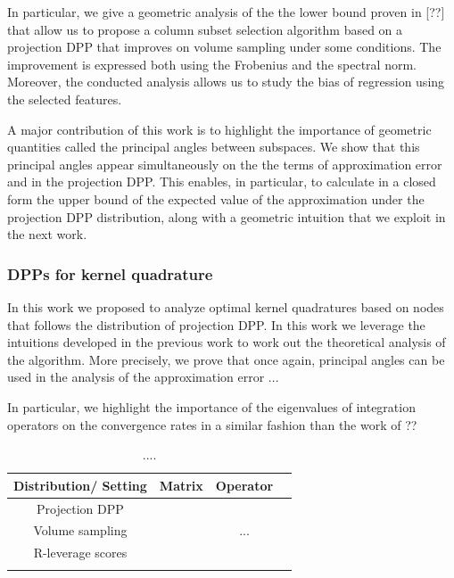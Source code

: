 \documentclass[twoside,11pt]{book}
\begin{document}
In particular, we give a geometric analysis of the the lower bound proven in [??] that allow us to propose a column subset selection algorithm based on a projection DPP that improves on volume sampling under some conditions. The improvement is expressed both using the Frobenius and the spectral norm. Moreover, the conducted analysis allows us to study the bias of regression using the selected features.

A major contribution of this work is to highlight the importance of geometric quantities called the principal angles between subspaces. We show that this principal angles appear simultaneously on the the terms of approximation error and in the projection DPP. This enables, in particular, to calculate in a closed form the upper bound of the expected value of the approximation under the projection DPP distribution, along with a geometric intuition that we exploit in the next work.

\subsubsection{DPPs for kernel quadrature}

In this work we proposed to analyze optimal kernel quadratures based on nodes that follows the distribution of projection DPP. 
In this work we leverage the intuitions developed in the previous work to work out the theoretical analysis of the algorithm. More precisely, we prove that once again, principal angles can be used in the analysis of the approximation error ...

In particular, we highlight the importance of the eigenvalues of integration operators on the convergence rates in a similar fashion than the work of ??



\begin{table}
\centering
 \begin{tabular}{| c| c| c| c|}
 \hline
  Distribution/ Setting & Matrix & Operator\\
 \hline
 Projection DPP& \cite{BeBaCh18} & \cite{BeBaCh19} \\
 \hline
 Volume sampling& \cite{DRVW06} & ... \\
 \hline
 R-leverage scores & \cite{Bac13}  & \cite{Bac17}  \\
 &  \cite{AlMa15} &   \\
\hline
\end{tabular}
\caption{....\label{table:matrix_operator_duality}}
\end{table}
\end{document}
